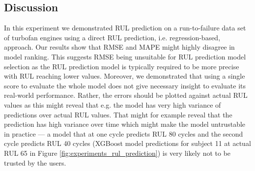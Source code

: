 \subsection{Discussion}

In this experiment we demonstrated RUL prediction on a run-to-failure data set of turbofan engines using a direct RUL prediction, i.e. regression-based, approach. 
Our results show that RMSE and MAPE might highly disagree in model ranking.
This suggests RMSE being unsuitable for RUL prediction model selection as the RUL prediction model is typically required to be more precise with RUL reaching lower values.
Moreover, we demonstrated that using a single score to evaluate the whole model does not give necessary insight to evaluate its real-world performance.
Rather, the errors should be plotted against actual RUL values as this might reveal that e.g. the model has very high variance of predictions over actual RUL values.
That might for example reveal that the prediction has high variance over time which might make the model untrustable in practice --- a model that at one cycle predicts RUL 80 cycles and the second cycle predicts RUL 40 cycles (XGBoost model predictions for subject 11 at actual RUL 65 in Figure \ref{fig:experiments_rul_prediction}) is very likely not to be trusted by the users.